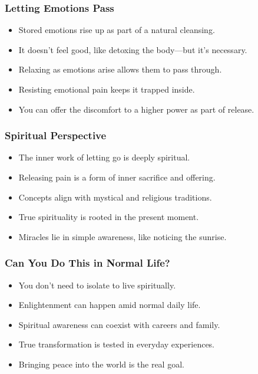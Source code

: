\begin{frame}[fragile]\frametitle{Letting Emotions Pass}
    \begin{itemize}
        \item Stored emotions rise up as part of a natural cleansing.
        \item It doesn’t feel good, like detoxing the body—but it’s necessary.
        \item Relaxing as emotions arise allows them to pass through.
        \item Resisting emotional pain keeps it trapped inside.
        \item You can offer the discomfort to a higher power as part of release.
    \end{itemize}
\end{frame}

\begin{frame}[fragile]\frametitle{Spiritual Perspective}
    \begin{itemize}
        \item The inner work of letting go is deeply spiritual.
        \item Releasing pain is a form of inner sacrifice and offering.
        \item Concepts align with mystical and religious traditions.
        \item True spirituality is rooted in the present moment.
        \item Miracles lie in simple awareness, like noticing the sunrise.
    \end{itemize}
\end{frame}

\begin{frame}[fragile]\frametitle{Can You Do This in Normal Life?}
    \begin{itemize}
        \item You don’t need to isolate to live spiritually.
        \item Enlightenment can happen amid normal daily life.
        \item Spiritual awareness can coexist with careers and family.
        \item True transformation is tested in everyday experiences.
        \item Bringing peace into the world is the real goal.
    \end{itemize}
\end{frame}

